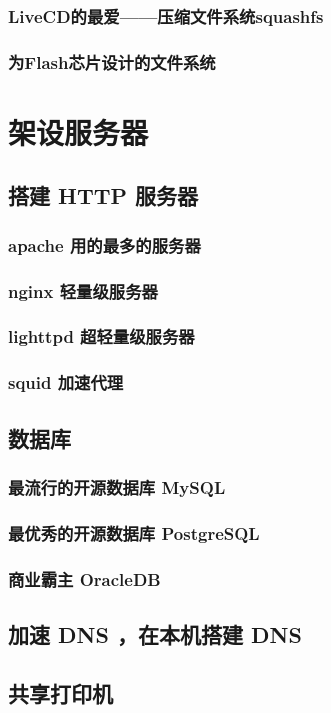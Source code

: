 \documentclass[amstex,twoside]{ctexbook}
\begin{document}
\subsection{  LiveCD的最爱——压缩文件系统squashfs}
\subsection{  为Flash芯片设计的文件系统}

\chapter{架设服务器}
\section{  搭建 HTTP 服务器}
\subsection{  apache 用的最多的服务器}
\subsection{ nginx 轻量级服务器}
\subsection{ lighttpd 超轻量级服务器}
\subsection{ squid 加速代理	}
\section{  数据库	}
\subsection{  最流行的开源数据库 MySQL}
\subsection{  最优秀的开源数据库 PostgreSQL 	}
\subsection{  商业霸主 OracleDB	}
\section{  加速 DNS ，在本机搭建 DNS	}
\section{  共享打印机	}
\end{document}
